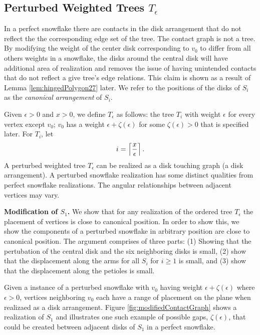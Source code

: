\subsection{Perturbed Weighted Trees $T_\epsilon$}
In a perfect snowflake there are contacts in the disk arrangement that do not reflect the the corresponding edge set of the tree.  
The contact graph is not a tree.
By modifying the weight of the center disk corresponding to $v_0$ to differ from all others weights in a snowflake, the disks around the central disk will have additional area of realization and removes the issue of having unintended contacts that do not reflect a give tree's edge relations.  
This claim is shown as a result of Lemma \ref{lem:hingedPolygon27} later.
We refer to the positions of the disks of $S_i$ as the \textit{canonical arrangement} of $S_i$.

Given $\epsilon > 0$ and $x >0$, we define $T_\epsilon$ as follows: the tree $T_i$ with weight $\epsilon$ for every vertex except $v_0$; $v_0$ has a weight $\epsilon + \zeta(\epsilon)$ for some $\zeta(\epsilon)>0$ that is specified later.  For $T_i$, let $$i = \left\lceil \frac{x}{\epsilon} \right\rceil .$$ 
A perturbed weighted tree $T_\epsilon$ can be realized as a disk touching graph (a disk arrangement).  
A perturbed snowflake realization has some distinct qualities from perfect snowflake realizations.  
The angular relationships between adjacent vertices may vary.

\textbf{Modification of $S_1$.}
We show that for any realization of the ordered tree $T_\epsilon$
 the placement of vertices is close to canonical position.  
In order to show this, we show the components of a perturbed snowflake in arbitrary position  are close to canonical position.  
The argument comprises of three parts: (1) Showing that the pertubation of the central disk and the six neighboring disks is small, (2) show that the displacement along the arms for all $S_i$ for $i \geq 1$ is small, and (3) show that the displacement along the petioles is small.  

Given a instance of a perturbed snowflake with $v_0$ having weight $\epsilon + \zeta(\epsilon)$ where $\epsilon > 0$, vertices neighboring $v_0$ each have a range of placement on the plane when realizaed as a disk arrangement. 
Figure \ref{fig:modifiedContactGraph} shows a realization of $S_1$ and illustrates one such example of possible gaps, $\zeta(\epsilon)$, that could be created between adjacent disks of $S_1$ in a perfect snowflake.  
 